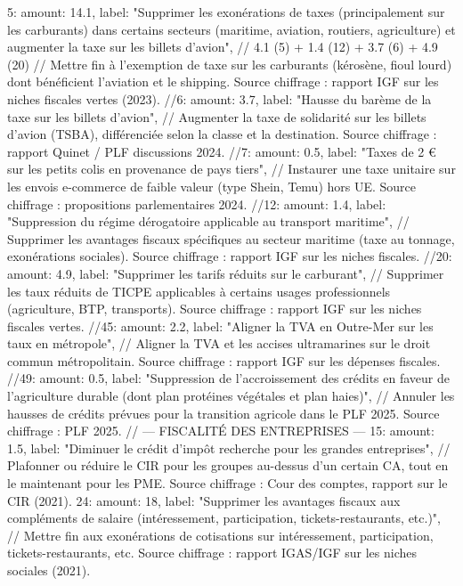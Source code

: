 {{{{{{{{{{{{{{		5:  { amount: 14.1,  label: "Supprimer les exonérations de taxes (principalement sur les carburants) dans certains secteurs (maritime, aviation, routiers, agriculture) et augmenter la taxe sur les billets d'avion"}, // 4.1 (5) + 1.4 (12) + 3.7 (6) + 4.9 (20)
			  // Mettre fin à l'exemption de taxe sur les carburants (kérosène, fioul lourd) dont bénéficient l'aviation et le shipping. Source chiffrage : rapport IGF sur les niches fiscales vertes (2023).
		//6:  { amount: 3.7,  label: "Hausse du barème de la taxe sur les billets d'avion"},
			  // Augmenter la taxe de solidarité sur les billets d'avion (TSBA), différenciée selon la classe et la destination. Source chiffrage : rapport Quinet / PLF discussions 2024.
		//7:  { amount: 0.5,  label: "Taxes de 2 € sur les petits colis en provenance de pays tiers"},
			  // Instaurer une taxe unitaire sur les envois e-commerce de faible valeur (type Shein, Temu) hors UE. Source chiffrage : propositions parlementaires 2024.
		//12: { amount: 1.4,  label: "Suppression du régime dérogatoire applicable au transport maritime"},
			  // Supprimer les avantages fiscaux spécifiques au secteur maritime (taxe au tonnage, exonérations sociales). Source chiffrage : rapport IGF sur les niches fiscales.
		//20: { amount: 4.9,  label: "Supprimer les tarifs réduits sur le carburant"},
			  // Supprimer les taux réduits de TICPE applicables à certains usages professionnels (agriculture, BTP, transports). Source chiffrage : rapport IGF sur les niches fiscales vertes.
		//45: { amount: 2.2,  label: "Aligner la TVA en Outre-Mer sur les taux en métropole"},
			  // Aligner la TVA et les accises ultramarines sur le droit commun métropolitain. Source chiffrage : rapport IGF sur les dépenses fiscales.
		//49: { amount: 0.5,  label: "Suppression de l'accroissement des crédits en faveur de l'agriculture durable (dont plan protéines végétales et plan haies)"},
			  // Annuler les hausses de crédits prévues pour la transition agricole dans le PLF 2025. Source chiffrage : PLF 2025.
		// --- FISCALITÉ DES ENTREPRISES ---
		15: { amount: 1.5,  label: "Diminuer le crédit d'impôt recherche pour les grandes entreprises"},
			  // Plafonner ou réduire le CIR pour les groupes au-dessus d'un certain CA, tout en le maintenant pour les PME. Source chiffrage : Cour des comptes, rapport sur le CIR (2021).
		24: { amount: 18,   label: "Supprimer les avantages fiscaux aux compléments de salaire (intéressement, participation, tickets-restaurants, etc.)"},
			  // Mettre fin aux exonérations de cotisations sur intéressement, participation, tickets-restaurants, etc. Source chiffrage : rapport IGAS/IGF sur les niches sociales (2021).
}}}}}}}}}}}}}}
